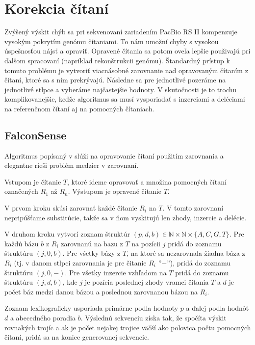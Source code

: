 \section{Korekcia čítaní}

Zvýšený výskit chýb sa pri sekvenovaní zariadením PacBio RS II kompenzuje vysokým pokrytím genómu čítaniami. To nám umožní chyby s vysokou úspešnosťou nájsť a opraviť. Opravené čítania sa potom oveľa lepšie použivajú pri ďalšom spracovaní (napríklad rekonštrukcii genómu). Štandardný prístup k tomuto problému je vytvoriť viacnásobné zarovnanie nad opravovaným čítaním z čítaní, ktoré sa s ním prekrývajú. Následne sa pre jednotlivé pozeráme na jednotlivé stlpce a vyberáme najčastejšie hodnoty. V skutočnosti je to trochu komplikovanejšie, keďže algoritmus sa musí vysporiadať s inzerciami a deléciami na referenčnom čítaní aj na pomocných čítaniach.

\subsection{FalconSense}

Algoritmus popísaný v \citep{berlin2015assembling} slúži na opravovanie čítaní použitím zarovnania a elegantne rieši problém medzier v zarovnaní. 

Vstupom je čítanie $T$, ktoré ideme opravovať a množina pomocných čítaní označených $R_1$ až $R_n$. Výstupom je opravené čitanie $T$.

V prvom kroku skúsi zarovnať každé čítanie $R_i$ na $T$. V tomto zarovnaní nepripúšťame substitúcie, takže sa v ňom vyskitujú len zhody, inzercie a delécie.

V druhom kroku vytvorí zoznam štruktúr $(p, d, b) \in  \mathbb{N} \times \mathbb{N} \times \{A, C, G, T\}$. Pre každú bázu $b$ z $R_i$ zarovnanú na bazu z $T$ na pozícii $j$ pridá do zoznamu štruktúru $(j, 0, b)$. Pre všetky bázy z $T$, na ktoré sa nezarovnala žiadna báza z $R_i$ (tj. v danom stlpci zarovnania je pre čitanie $R_i$ ''$-$''), pridá do zoznamu štruktúru $(j, 0, -)$. Pre všetky inzercie vzhľadom na $T$ pridá do zoznamu štruktúru $(j, d, b)$, kde $j$ je pozícia poslednej zhody vramci čítania $T$ a $d$ je počet báz medzi danou bázou a poslednou zarovnanou bázou na $R_i$. 

Zoznam lexikograficky usporiada primárne podľa hodnoty $p$ a ďalej podľa hodnôt $d$ a abecedného poradia $b$. Výslednú sekvenciu získa tak, že spočíta výskit rovnakých trojíc a ak je počet nejakej trojice väčší ako polovica počtu pomocných čítaní, pridá sa na koniec generovanej sekvencie.

